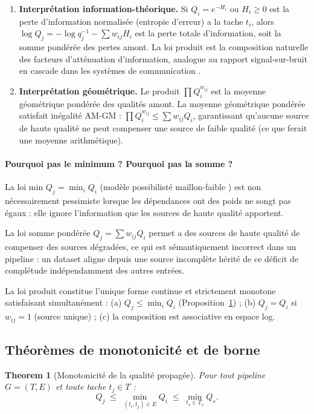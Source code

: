 \documentclass[12pt]{article}
\newtheorem{theorem}{Theorem}[section]
\begin{document}
\begin{enumerate}
	\item \textbf{Interprétation information-théorique.}
	Si $Q_i = e^{-H_i}$ ou $H_i \geq 0$ est la perte d'information
	normalisée (entropie d'erreur) a la tache $t_i$, alors
	$\log Q_j = -\log q_j^{-1} - \sum w_{ij} H_i$ est la perte
	totale d'information, soit la somme pondérée des pertes amont.
	La loi produit est la composition naturelle des facteurs
	d’atténuation d'information, analogue au rapport signal-sur-bruit
	en cascade dans les systèmes de communication \cite{shannon_info}.
	
	\item \textbf{Interprétation géométrique.}
	Le produit $\prod Q_i^{w_{ij}}$ est la moyenne géométrique pondérée
	des qualités amont. La moyenne géométrique pondérée satisfait
	inégalité AM-GM : $\prod Q_i^{w_{ij}} \leq \sum w_{ij} Q_i$,
	garantissant qu'aucune source de haute qualité ne peut compenser
	une source de faible qualité (ce que ferait une moyenne arithmétique).
\end{enumerate}
\paragraph{Pourquoi pas le minimum ? Pourquoi pas la somme ?}

La loi min $Q_j = \min_i Q_i$ (modèle possibilisté maillon-faible
\cite{possibility_theory}) est non nécessairement pessimiste lorsque les
dépendances ont des poids ne songt pas égaux : elle ignore l'information que
les sources de haute qualité apportent.

La loi somme pondérée $Q_j = \sum w_{ij} Q_i$ permet a des sources de
haute qualité de compenser des sources dégradées, ce qui est
sémantiquement incorrect dans un pipeline : un dataset aligne depuis
une source incomplète hérité de ce déficit de complétude indépendamment des autres entrées.

La loi produit constitue l'unique forme continue et strictement
monotone satisfaisant simultanément :
(a) $Q_j \leq \min_i Q_i$ (Proposition~\ref{thm:monotone}) ;
(b) $Q_j = Q_i$ si $w_{ij}=1$ (source unique) ;
(c) la composition est associative en espace log.

	\subsection{Théorèmes de monotonicité et de borne}

\begin{theorem}[Monotonicité de la qualité propagée]
	\label{thm:monotone}
	Pour tout pipeline $G=(T,E)$ et toute tache $t_j \in T$ :
	\begin{equation}
		Q_j \;\leq\; \min_{(t_i,t_j)\in E} Q_i
		\;\leq\; \min_{t_s \in T_s} Q_s.
		\label{eq:monotone}
	\end{equation}
\end{theorem}
\end{document}
